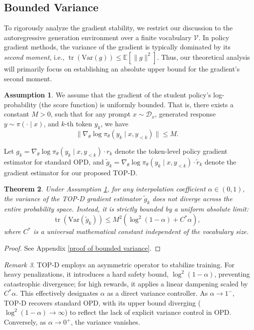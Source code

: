 \documentclass{article}
\theoremstyle{plain}
\newtheorem{theorem}{Theorem}[section]
\theoremstyle{definition}
\newtheorem{assumption}[theorem]{Assumption}
\theoremstyle{remark}
\newtheorem{remark}[theorem]{Remark}
\begin{document}
\subsection{Bounded Variance}\label{Bounded Variance}
To rigorously analyze the gradient stability, we restrict our discussion to the autoregressive generation environment over a finite vocabulary $\mathcal{V}$. In policy gradient methods, the variance of the gradient is typically dominated by its \textit{second moment}, i.e., $\operatorname{tr}(\mathrm{Var}(g))\leq\mathbb{E}[\lVert g\rVert^2]$. Thus, our theoretical analysis will primarily focus on establishing an absolute upper bound for the gradient's second moment.
\begin{assumption}\label{assumption 1}
	We assume that the gradient of the student policy's log-probability (the score function) is uniformly bounded. That is, there exists a constant $M>0$, such that for any prompt $x\sim\mathcal{D}_x$, generated response $y\sim\pi(\cdot\mid x)$, and $k$-th token $y_k$, we have
	\begin{equation}
		\lVert\nabla_{\theta}\log\pi_{\theta}(y_k\mid x,y_{<k})\rVert\leq M.
	\end{equation}
\end{assumption}
Let $g_k=\nabla_{\theta}\log\pi_{\theta}(y_k\mid x,y_{<k})\cdot r_k$ denote the token-level policy gradient estimator for standard OPD, and $\tilde{g}_k=\nabla_{\theta}\log\pi_{\theta}(y_k\mid x,y_{<k})\cdot\tilde{r}_k$ denote the gradient estimator for our proposed TOP-D.
\begin{theorem}\label{bounded variance}
	Under Assumption \ref{assumption 1}, for any interpolation coefficient $\alpha\in(0,1)$, the variance of the TOP-D gradient estimator $\tilde{g}_k$ does not diverge across the entire probability space. Instead, it is strictly bounded by a uniform absolute limit:
	\begin{equation}
		\operatorname{tr}(\mathrm{Var}(\tilde{g}_k))\leq M^2\left(\log^2(1-\alpha)+C^*\alpha\right),
	\end{equation}
	where $C^*$ is a universal mathematical constant independent of the vocabulary size.
\end{theorem}
\begin{proof}
	See Appendix \ref{proof of bounded variance}.
\end{proof}
\begin{remark}
	TOP-D employs an asymmetric operator to stabilize training. For heavy penalizations, it introduces a hard safety bound, $\log^2(1-\alpha)$, preventing catastrophic divergence; for high rewards, it applies a linear dampening scaled by $C^*\alpha$. This effectively designates $\alpha$ as a direct variance controller. As $\alpha \to 1^-$, TOP-D recovers standard OPD, with its upper bound diverging ($\log^2(1-\alpha) \to \infty$) to reflect the lack of explicit variance control in OPD. Conversely, as $\alpha \to 0^+$, the variance vanishes.
\end{remark}
\end{document}
